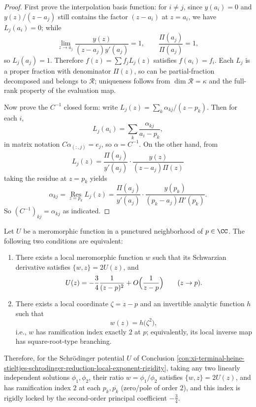\begin{proof}
First prove the interpolation basis function: for \(i\ne j\), since \(y(a_i)=0\) and \(y(z)/(z-a_j)\) still contains the factor \((z-a_i)\) at \(z=a_i\), we have \(L_j(a_i)=0\);
while
\[
\lim_{z\to a_j}\frac{y(z)}{(z-a_j)y'(a_j)}=1,
\qquad
\frac{\Pi(a_j)}{\Pi(a_j)}=1,
\]
so \(L_j(a_j)=1\).
Therefore \(f(z)=\sum f_j L_j(z)\) satisfies \(f(a_i)=f_i\).
Each \(L_j\) is a proper fraction with denominator \(\Pi(z)\), so can be partial-fraction decomposed and belongs to \(\mathcal R\); uniqueness follows from \(\dim\mathcal R=\kappa\) and the full-rank property of the evaluation map.
\par
Now prove the \(C^{-1}\) closed form: write \(L_j(z)=\sum_{k} \alpha_{kj}/(z-p_k)\).
Then for each \(i\),
\[
L_j(a_i)=\sum_k\frac{\alpha_{kj}}{a_i-p_k},
\]
in matrix notation \(C\alpha_{(:,j)}=e_j\), so \(\alpha=C^{-1}\).
On the other hand, from
\[
L_j(z)=\frac{\Pi(a_j)}{y'(a_j)}\cdot\frac{y(z)}{(z-a_j)\Pi(z)}
\]
taking the residue at \(z=p_k\) yields
\[
\alpha_{k j}
=\operatorname*{Res}_{z=p_k}L_j(z)
=\frac{\Pi(a_j)}{y'(a_j)}\cdot\frac{y(p_k)}{(p_k-a_j)\Pi'(p_k)}.
\]
So \((C^{-1})_{kj}=\alpha_{kj}\) as indicated.
\end{proof}
\begin{conclusion}\label{con:xi-terminal-schwarzian-rigidity-branch-index-2}
Let \(U\) be a meromorphic function in a punctured neighborhood of \(p\in\CC\).
The following two conditions are equivalent:
\begin{enumerate}
  \item There exists a local meromorphic function \(w\) such that its Schwarzian derivative satisfies \(\{w,z\}=2U(z)\), and
  \[
  U(z)=-\frac34\frac{1}{(z-p)^2}+O\Bigl(\frac{1}{z-p}\Bigr)\qquad(z\to p).
  \]
  \item There exists a local coordinate \(\zeta=z-p\) and an invertible analytic function \(h\) such that
  \[
  w(z)=h\bigl(\zeta^{2}\bigr),
  \]
  i.e., \(w\) has ramification index exactly \(2\) at \(p\); equivalently, its local inverse map has square-root-type branching.
\end{enumerate}
Therefore, for the Schr\"odinger potential \(U\) of Conclusion \ref{con:xi-terminal-heine-stieltjes-schrodinger-reduction-local-exponent-rigidity}, taking any two linearly independent solutions \(\phi_1,\phi_2\), their ratio \(w=\phi_1/\phi_2\) satisfies \(\{w,z\}=2U(z)\), and has ramification index \(2\) at each \(p_k,\overline{p_k}\) (zero/pole of order \(2\)), and this index is rigidly locked by the second-order principal coefficient \(-\tfrac34\).
\end{conclusion}
